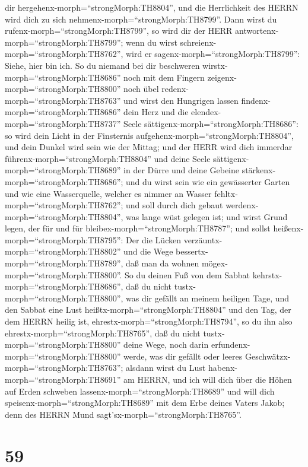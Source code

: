 dir hergehenx-morph=``strongMorph:TH8804'', und die Herrlichkeit des
HERRN wird dich zu sich nehmenx-morph=``strongMorph:TH8799''.
 Dann wirst du rufenx-morph=``strongMorph:TH8799'', so wird
dir der HERR antwortenx-morph=``strongMorph:TH8799''; wenn du wirst
schreienx-morph=``strongMorph:TH8762'', wird er
sagenx-morph=``strongMorph:TH8799'': Siehe, hier bin ich. So du niemand
bei dir beschweren wirstx-morph=``strongMorph:TH8686'' noch mit dem
Fingern zeigenx-morph=``strongMorph:TH8800'' noch übel
redenx-morph=``strongMorph:TH8763''  und wirst den
Hungrigen lassen findenx-morph=``strongMorph:TH8686'' dein Herz und die
elendex-morph=``strongMorph:TH8737'' Seele
sättigenx-morph=``strongMorph:TH8686'': so wird dein Licht in der
Finsternis aufgehenx-morph=``strongMorph:TH8804'', und dein Dunkel wird
sein wie der Mittag;  und der HERR wird dich immerdar
führenx-morph=``strongMorph:TH8804'' und deine Seele
sättigenx-morph=``strongMorph:TH8689'' in der Dürre und deine Gebeine
stärkenx-morph=``strongMorph:TH8686''; und du wirst sein wie ein
gewässerter Garten und wie eine Wasserquelle, welcher es nimmer an
Wasser fehltx-morph=``strongMorph:TH8762'';  und soll durch
dich gebaut werdenx-morph=``strongMorph:TH8804'', was lange wüst gelegen
ist; und wirst Grund legen, der für und für
bleibex-morph=``strongMorph:TH8787''; und sollst
heißenx-morph=``strongMorph:TH8795'': Der die Lücken
verzäuntx-morph=``strongMorph:TH8802'' und die Wege
bessertx-morph=``strongMorph:TH8789'', daß man da wohnen
mögex-morph=``strongMorph:TH8800''.  So du deinen Fuß von
dem Sabbat kehrstx-morph=``strongMorph:TH8686'', daß du nicht
tustx-morph=``strongMorph:TH8800'', was dir gefällt an meinem heiligen
Tage, und den Sabbat eine Lust heißtx-morph=``strongMorph:TH8804'' und
den Tag, der dem HERRN heilig ist, ehrestx-morph=``strongMorph:TH8794'',
so du ihn also ehrestx-morph=``strongMorph:TH8765'', daß du nicht
tustx-morph=``strongMorph:TH8800'' deine Wege, noch darin
erfundenx-morph=``strongMorph:TH8800'' werde, was dir gefällt oder
leeres Geschwätzx-morph=``strongMorph:TH8763'';  alsdann
wirst du Lust habenx-morph=``strongMorph:TH8691'' am HERRN, und ich will
dich über die Höhen auf Erden schweben
lassenx-morph=``strongMorph:TH8689'' und will dich
speisenx-morph=``strongMorph:TH8689'' mit dem Erbe deines Vaters Jakob;
denn des HERRN Mund sagt'sx-morph=``strongMorph:TH8765''.

\hypertarget{section-58}{%
\section{59}\label{section-58}}

